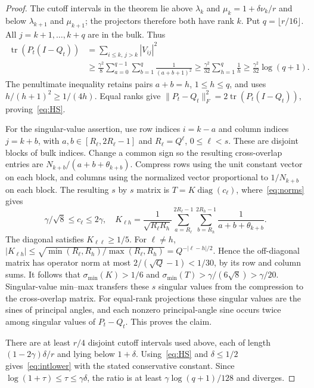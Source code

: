 \documentclass[11pt]{article}
\newcommand{\tr}{\operatorname{tr}}
\begin{document}
\begin{proof}
The cutoff intervals in the theorem lie above $\lambda_k$ and
$\mu_k=1+\delta\nu_k/r$ and below $\lambda_{k+1}$ and $\mu_{k+1}$;
the projectors therefore both have rank $k$. Put $q=\lfloor r/16\rfloor$.
All $j=k+1,\ldots,k+q$ are in the bulk. Thus
\begin{align*}
 \tr(P_t(I-Q_t))
 &=\sum_{i\le k,\,j>k}|V_{ij}|^2\\
 &\ge\frac{\gamma^2}{8}
       \sum_{a=0}^{q-1}\sum_{b=1}^q\frac1{(a+b+1)^2}
 \ge\frac{\gamma^2}{32}\sum_{h=1}^q\frac1h
 \ge\frac{\gamma^2}{32}\log(q+1).
\end{align*}
The penultimate inequality retains pairs $a+b=h$, $1\le h\le q$,
and uses $h/(h+1)^2\ge1/(4h)$.
Equal ranks give $\|P_t-Q_t\|_F^2=2\tr(P_t(I-Q_t))$,
proving~\eqref{eq:HS}.

For the singular-value assertion, use row indices $i=k-a$ and column
indices $j=k+b$, with $a,b\in[R_\ell,2R_\ell-1]$ and
$R_\ell=Q^\ell$, $0\le\ell<s$.
These are disjoint blocks of bulk indices. Change a common sign so
the resulting cross-overlap entries are $N_{k+b}/(a+b+\theta_{k+b})$.
Compress rows using the unit constant vector on each block, and columns
using the normalized vector proportional to $1/N_{k+b}$ on each block.
The resulting $s$ by $s$ matrix is $T=K\operatorname{diag}(c_\ell)$,
where~\eqref{eq:norms} gives
\[
 \gamma/\sqrt8\le c_\ell\le2\gamma,
 \quad K_{\ell h}=\frac1{\sqrt{R_\ell R_h}}
 \sum_{a=R_\ell}^{2R_\ell-1}\sum_{b=R_h}^{2R_h-1}
                \frac1{a+b+\theta_{k+b}}.
\]
The diagonal satisfies $K_{\ell\ell}\ge1/5$.
For $\ell\ne h$,
$|K_{\ell h}|\le\sqrt{\min(R_\ell,R_h)/\max(R_\ell,R_h)}
=Q^{-|\ell-h|/2}$.
Hence the off-diagonal matrix has operator norm at most
$2/(\sqrt Q-1)<1/30$, by its row and column sums.
It follows that $\sigma_{\min}(K)>1/6$ and
$\sigma_{\min}(T)>\gamma/(6\sqrt8)>\gamma/20$.
Singular-value min--max transfers these $s$ singular values from the
compression to the cross-overlap matrix.
For equal-rank projections these singular values are the sines of
principal angles, and each nonzero principal-angle sine occurs twice
among singular values of $P_t-Q_t$. This proves the claim.

There are at least $r/4$ disjoint cutoff intervals used above,
each of length $(1-2\gamma)\delta/r$ and lying below $1+\delta$.
Using~\eqref{eq:HS} and $\delta\le1/2$ gives~\eqref{eq:intlower}
with the stated conservative constant. Since
$\log(1+\tau)\le\tau\le\gamma\delta$, the ratio is at least
$\gamma\log(q+1)/128$ and diverges.
\end{proof}
\end{document}
